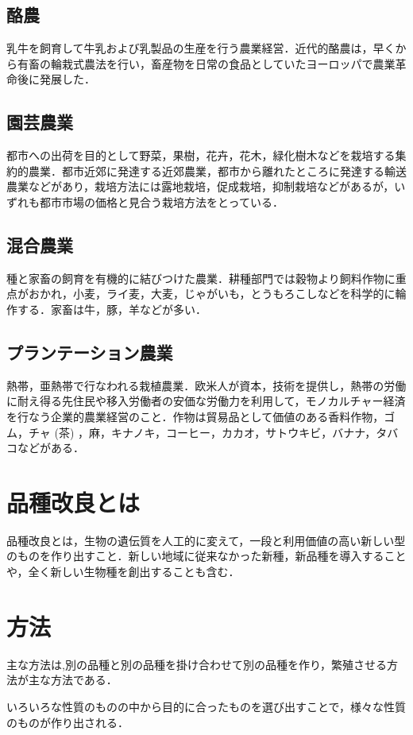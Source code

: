 \subsection{酪農}
乳牛を飼育して牛乳および乳製品の生産を行う農業経営．近代的酪農は，早くから有畜の輪栽式農法を行い，畜産物を日常の食品としていたヨーロッパで農業革命後に発展した．
\subsection{園芸農業}
都市への出荷を目的として野菜，果樹，花卉，花木，緑化樹木などを栽培する集約的農業．都市近郊に発達する近郊農業，都市から離れたところに発達する輸送農業などがあり，栽培方法には露地栽培，促成栽培，抑制栽培などがあるが，いずれも都市市場の価格と見合う栽培方法をとっている．
\subsection{混合農業}
種と家畜の飼育を有機的に結びつけた農業．耕種部門では穀物より飼料作物に重点がおかれ，小麦，ライ麦，大麦，じゃがいも，とうもろこしなどを科学的に輪作する．家畜は牛，豚，羊などが多い．
\subsection{プランテーション農業}
熱帯，亜熱帯で行なわれる栽植農業．欧米人が資本，技術を提供し，熱帯の労働に耐え得る先住民や移入労働者の安価な労働力を利用して，モノカルチャー経済を行なう企業的農業経営のこと．作物は貿易品として価値のある香料作物，ゴム，チャ (茶) ，麻，キナノキ，コーヒー，カカオ，サトウキビ，バナナ，タバコなどがある．
\section{品種改良とは}
品種改良とは，生物の遺伝質を人工的に変えて，一段と利用価値の高い新しい型のものを作り出すこと．新しい地域に従来なかった新種，新品種を導入することや，全く新しい生物種を創出することも含む．\cite{kinoko2015}
\section{方法}
主な方法は,別の品種と別の品種を掛け合わせて別の品種を作り，繁殖させる方法が主な方法である．

いろいろな性質のものの中から目的に合ったものを選び出すことで，様々な性質のものが作り出される．

